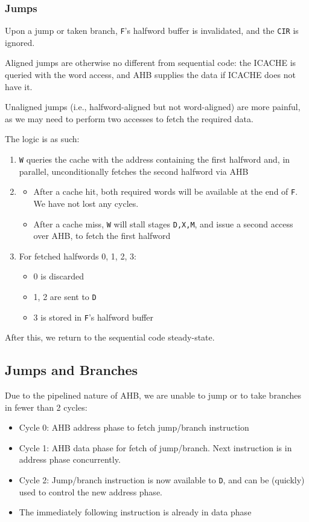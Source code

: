 \documentclass{article}
\begin{document}
\subsubsection{Jumps}

Upon a jump or taken branch, \texttt{F}'s halfword buffer is invalidated, and the \texttt{CIR} is ignored.

Aligned jumps are otherwise no different from sequential code: the ICACHE is queried with the word access, and AHB supplies the data if ICACHE does not have it.

Unaligned jumps (i.e., halfword-aligned but not word-aligned) are more painful, as we may need to perform two accesses to fetch the required data.

The logic is as such:

\begin{enumerate}
\item \texttt{W} queries the cache with the address containing the first halfword and, in parallel, unconditionally fetches the second halfword via AHB
\item 
	\begin{itemize}
	\item After a cache hit, both required words will be available at the end of \texttt{F}. We have not lost any cycles.
	\item After a cache miss, \texttt{W} will stall stages \texttt{D,X,M}, and issue a second access over AHB, to fetch the first halfword			\end{itemize}
\item For fetched halfwords 0, 1, 2, 3:
	\begin{itemize}
	\item 0 is discarded
	\item 1, 2 are sent to \texttt{D}
	\item 3 is stored in \texttt{F}'s halfword buffer
	\end{itemize}
\end{enumerate} 

After this, we return to the sequential code steady-state.

\subsection{Jumps and Branches}

Due to the pipelined nature of AHB, we are unable to jump or to take branches in fewer than 2 cycles:

\begin{itemize}
\item Cycle 0: AHB address phase to fetch jump/branch instruction
\item Cycle 1: AHB data phase for fetch of jump/branch. Next instruction is in address phase concurrently.
\item Cycle 2: Jump/branch instruction is now available to \texttt{D}, and can be (quickly) used to control the new address phase.
\item The immediately following instruction is already in data phase
\end{itemize}
\end{document}
